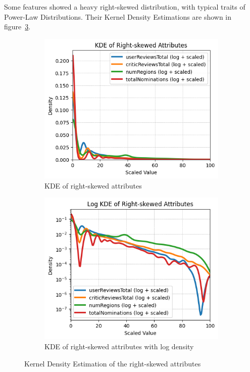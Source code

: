 Some features showed a heavy right-skewed distribution, with typical traits of Power-Law Distributions. Their Kernel Density Estimations are shown in figure~\ref{fig:left_skewed}.

\begin{figure}[H]
    \centering
    \begin{subfigure}{0.48\textwidth}
        \includegraphics[width=\textwidth]{plots/left_skew_distribs.png}
        \captionsetup{width=0.9\linewidth, justification=centering}
        \caption{KDE of right-skewed attributes}
        \label{fig:sub1_KDE_left_skew}
    \end{subfigure}
    \begin{subfigure}{0.48\textwidth}
        \includegraphics[width=\textwidth]{plots/left_skew_distribs_log.png}
        \captionsetup{width=0.9\linewidth, justification=centering}
        \caption{KDE of right-skewed attributes with log density}
        \label{fig:sub2_KDE_left_skew}
    \end{subfigure}
    \caption{Kernel Density Estimation of the right-skewed attributes}
    \label{fig:left_skewed}
\end{figure}

